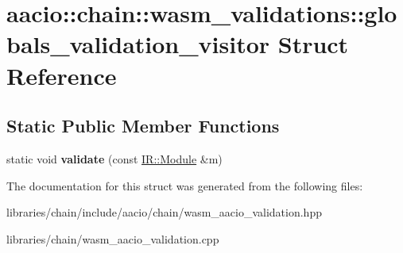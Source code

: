\hypertarget{structaacio_1_1chain_1_1wasm__validations_1_1globals__validation__visitor}{}\section{aacio\+:\+:chain\+:\+:wasm\+\_\+validations\+:\+:globals\+\_\+validation\+\_\+visitor Struct Reference}
\label{structaacio_1_1chain_1_1wasm__validations_1_1globals__validation__visitor}
\subsection*{Static Public Member Functions}
\begin{DoxyCompactItemize}
\item 
\mbox{\label{structaacio_1_1chain_1_1wasm__validations_1_1globals__validation__visitor_ae2e57f356a16e115fbb1786a244d9b5a}} 
static void {\bfseries validate} (const \mbox{\hyperlink{struct_i_r_1_1_module}{I\+R\+::\+Module}} \&m)
\end{DoxyCompactItemize}


The documentation for this struct was generated from the following files\+:\begin{DoxyCompactItemize}
\item 
libraries/chain/include/aacio/chain/wasm\+\_\+aacio\+\_\+validation.\+hpp\item 
libraries/chain/wasm\+\_\+aacio\+\_\+validation.\+cpp\end{DoxyCompactItemize}
